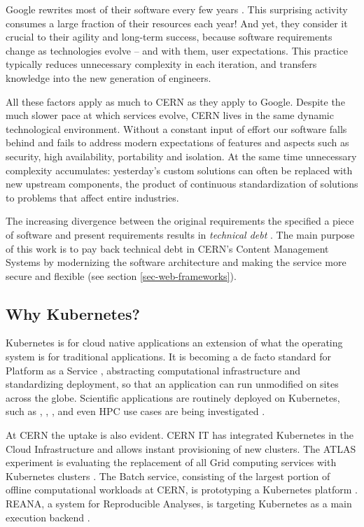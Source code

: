 Google rewrites most of their software every few years \cite{henderson_software_2020}.
This surprising activity consumes a large fraction of their resources each year!
And yet, they consider it crucial to their agility and long-term success, because software requirements change as technologies evolve -- and with them, user expectations.
This practice typically reduces unnecessary complexity in each iteration,
and transfers knowledge into the new generation of engineers.

All these factors apply as much to CERN as they apply to Google.
Despite the much slower pace at which services evolve, CERN lives in the same dynamic technological environment.
Without a constant input of effort our software falls behind and fails to address modern expectations
of features and aspects such as security, high availability, portability and isolation.
At the same time unnecessary complexity accumulates:
yesterday's custom solutions can often be replaced with new upstream components,
the product of continuous standardization of solutions to problems that affect entire industries.

The increasing divergence between the original requirements the specified a piece of software and present requirements
results in \emph{technical debt} \cite{fairbanks_ur-technical_2020}.
The main purpose of this work is to pay back technical debt in CERN's Content Management Systems by modernizing the software architecture
and making the service more secure and flexible (see section \ref{sec-web-frameworks}).


\subsection{Why Kubernetes?}

Kubernetes is for cloud native applications an extension of what the operating system is for traditional applications.
It is becoming a de facto standard for Platform as a Service \cite{kaviani_towards_2019}, abstracting computational infrastructure and standardizing deployment,
so that an application can run unmodified on sites across the globe.
Scientific applications are routinely deployed on Kubernetes, such as \cite{banek_why_2019}, \cite{hariri_batch_2018}, \cite{yuan_bioinformatics_2020},
and even HPC use cases are being investigated \cite{beltre_enabling_2019}.

At CERN the uptake is also evident.
CERN IT has integrated Kubernetes in the Cloud Infrastructure and allows instant provisioning of new clusters.
The ATLAS experiment is evaluating the replacement of all Grid computing services with Kubernetes clusters \cite{megino_using_2020}.
The Batch service, consisting of the largest portion of offline computational workloads at CERN, is prototyping a Kubernetes platform \cite{alvarez_managing_2020}.
REANA, a system for Reproducible Analyses, is targeting Kubernetes as a main execution backend \cite{simko_reana_2019}.

